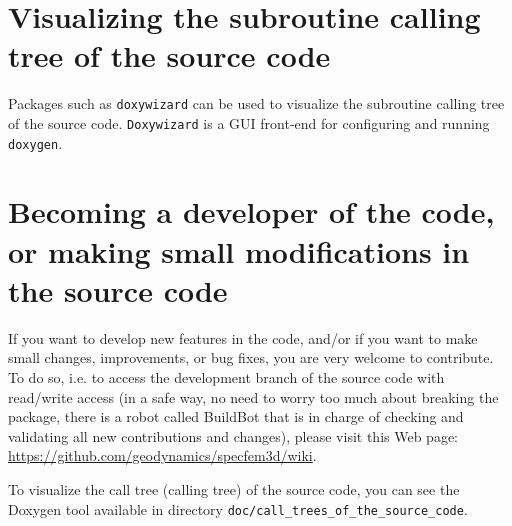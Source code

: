 \section{Visualizing the subroutine calling tree of the source code}

Packages such as \texttt{doxywizard} can be used to visualize the subroutine calling tree of the source code.
\texttt{Doxywizard} is a GUI front-end for configuring and running \texttt{doxygen}.

\section{Becoming a developer of the code, or making small modifications in the source code}

If you want to develop new features in the code, and/or if you want to make small changes, improvements, or bug fixes, you are very welcome to contribute. To do so, i.e. to access the development branch of the source code with read/write access (in a safe way, no need to worry too much about breaking the package, there is a robot called BuildBot that is in charge of checking and validating all new contributions and changes), please visit this Web page: \url{https://github.com/geodynamics/specfem3d/wiki}.

To visualize the call tree (calling tree) of the source code, you can see the Doxygen tool available in directory \texttt{doc/call\_trees\_of\_the\_source\_code}.

